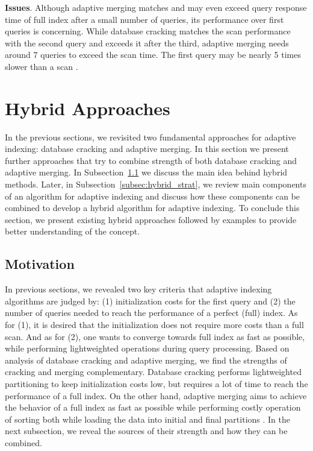 \documentclass[10pt, conference, compsocconf]{IEEEtran}
\begin{document}
\textbf{Issues}. Although adaptive merging matches and may even exceed query response time of full index after a small number of queries, its performance over first queries is concerning. While database cracking matches the scan performance with the second query and exceeds it after the third, adaptive merging needs around 7 queries to exceed the scan time. The first query may be nearly 5 times slower than a scan \cite{hybrid}.

\section{Hybrid Approaches}
\label{sec:hybrid}
In the previous sections, we revisited two fundamental approaches for adaptive indexing: database cracking and adaptive merging. In this section we present further approaches that try to combine strength of both database cracking and adaptive merging. In Subsection~\ref{subsec:hybrid_motiv} we discuss the main idea behind hybrid methods. Later, in Subsection~\ref{subsec:hybrid_strat}, we review main components of an algorithm for adaptive indexing and discuss how these components can be combined to develop a hybrid algorithm for adaptive indexing. To conclude this section, we present existing hybrid approaches followed by examples to provide better understanding of the concept.

\subsection{Motivation}
\label{subsec:hybrid_motiv}
In previous sections, we revealed two key criteria that adaptive indexing algorithms are judged by: (1) initialization costs for the first query and (2) the number of queries needed to reach the performance of a perfect (full) index. As for (1), it is desired that the initialization does not require more costs than a full scan. And as for (2), one wants to converge towards full index as fast as possible, while performing lightweighted operations during query processing. Based on analysis of database cracking and adaptive merging, we find the strengths of cracking and merging complementary. Database cracking performs lightweighted partitioning to keep initialization costs low, but requires a lot of time to reach the performance of a full index. On the other hand, adaptive merging aims to achieve the behavior of a full index as fast as possible while performing costly operation of sorting both while loading the data into initial and final partitions \cite{hybrid}. In the next subsection, we reveal the sources of their strength and how they can be combined.
\end{document}
